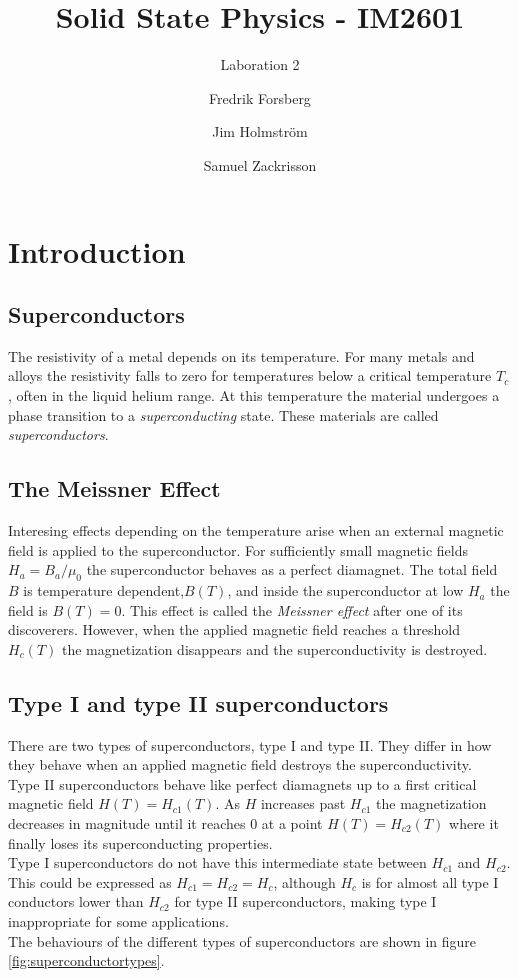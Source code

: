 \documentclass[a4paper,twoside=false,abstract=false,numbers=noenddot,
titlepage=false,headings=small,parskip=half,version=last]{scrartcl}
\title{Solid State Physics - IM2601}
\subtitle{Laboration 2}
\author[1]{Fredrik Forsberg}
\author[1]{Jim Holmström}
\author[1]{Samuel Zackrisson}
\affil[1]{Engineering Physics, Royal Institute of Technology}
\affil[1]{\{fforsber, jimho, samuelz\}@kth.se}
\begin{document}
\maketitle
\thispagestyle{empty}

\section{Introduction}
\subsection{Superconductors}
The resistivity of a metal depends on its temperature. 
For many metals and alloys the resistivity falls to zero for temperatures below a critical temperature $T_c$, often in the liquid helium range.
At this temperature the material undergoes a phase transition to a \emph{superconducting} state.
These materials are called \emph{superconductors}.

\subsection{The Meissner Effect}
Interesing effects depending on the temperature arise when an external magnetic field is applied to the superconductor. For sufficiently small magnetic fields $H_a=B_a / \mu_0$ the superconductor behaves as a perfect diamagnet. The total field $B$ is temperature dependent,$B(T)$, and inside the superconductor at low $H_a$ the field is $B(T)=0$. This effect is called the \emph{Meissner effect} after one of its discoverers. However, when the applied magnetic field reaches a threshold $H_c(T)$ the magnetization disappears and the superconductivity is destroyed.

\subsection{Type I and type II superconductors}
There are two types of superconductors, type I and type II.
They differ in how they behave when an applied magnetic field destroys the superconductivity.\\
Type II superconductors behave like perfect diamagnets up to a first critical magnetic field $H(T)=H_{c1}(T)$.
As $H$ increases past $H_{c1}$ the magnetization decreases in magnitude until it reaches 0 at a point $H(T)=H_{c2}(T)$ where it finally loses its superconducting properties.\\
Type I superconductors do not have this intermediate state between $H_{c1}$ and $H_{c2}$.
This could be expressed as $H_{c1}=H_{c2}=H_c$, although $H_c$ is for almost all type I conductors lower than $H_{c2}$ for type II superconductors, making type I inappropriate for some applications.\\
The behaviours of the different types of superconductors are shown in figure \ref{fig:superconductortypes}.
\end{document}
